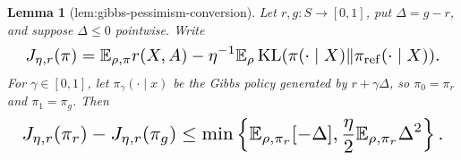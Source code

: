 \documentclass{article}
\newtheorem{lemma}{Lemma}
\begin{document}
\begin{lemma}[lem:gibbs-pessimism-conversion]\label{lem:gibbs-pessimism-conversion}
Let \(r,g:S\to[0,1]\), put \(\Delta=g-r\), and suppose \(\Delta\le0\) pointwise. Write
\[
\makebox[\linewidth][c]{\resizebox{0.98\linewidth}{!}{\par\noindent \makebox[\linewidth][c]{\resizebox{0.98\linewidth}{!}{\(\displaystyle \displaystyle J_{\eta,r}(\pi)=\mathbb E_{\rho,\pi}r(X,A)-\eta^{-1}\mathbb E_\rho\operatorname{KL}(\pi(\cdot\mid X)\Vert\pi_{\mathrm{ref}}(\cdot\mid X)).\)}}\par\noindent}}
\]
For \(\gamma\in[0,1]\), let \(\pi_\gamma(\cdot\mid x)\) be the Gibbs policy generated by \(r+\gamma\Delta\), so \(\pi_0=\pi_r\) and \(\pi_1=\pi_g\). Then
\[
\makebox[\linewidth][c]{\resizebox{0.98\linewidth}{!}{\(\displaystyle J_{\eta,r}(\pi_r)-J_{\eta,r}(\pi_g)
\le\min\left\{\mathbb E_{\rho,\pi_r}[-\Delta],\frac\eta2\mathbb E_{\rho,\pi_r}\Delta^2\right\}.\)}}
\]
\end{lemma}
\end{document}
